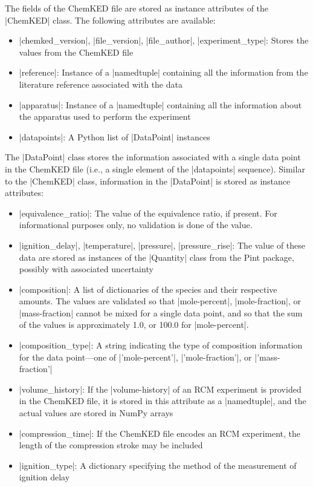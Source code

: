 \documentclass[12pt]{ijck}
\newcommand\ck{ChemKED}
\begin{document}
The fields of the \ck{} file are stored as instance attributes of the
\pybox|ChemKED| class. The following attributes are available:
%
\begin{itemize}
    \item \pybox|chemked_version|, \pybox|file_version|, \pybox|file_author|,
    \pybox|experiment_type|: Stores the values from the \ck{} file
    \item \pybox|reference|: Instance of a \pybox|namedtuple| containing all
    the information from the literature reference associated with the data
    \item \pybox|apparatus|: Instance of a \pybox|namedtuple| containing all
    the information about the apparatus used to perform the experiment
    \item \pybox|datapoints|: A Python list of \pybox|DataPoint| instances
\end{itemize}

The \pybox|DataPoint| class stores the information associated with a single data
point in the \ck{} file (i.e., a single element of the \yabox|datapoints|
sequence). Similar to the \pybox|ChemKED| class, information in the
\pybox|DataPoint| is stored as instance attributes:
%
\begin{itemize}
    \item \pybox|equivalence_ratio|: The value of the equivalence ratio, if
    present. For informational purposes only, no validation is done of the
    value.
    \item \pybox|ignition_delay|, \pybox|temperature|, \pybox|pressure|,
    \pybox|pressure_rise|: The value of these data are stored as instances of
    the \pybox|Quantity| class from the Pint \autocite{Grecco2016} package,
    possibly with associated uncertainty
    \item \pybox|composition|: A list of dictionaries of the species and their
    respective amounts. The values are validated so that \yabox|mole-percent|,
    \yabox|mole-fraction|, or \yabox|mass-fraction| cannot be mixed for a single
    data point, and so that the sum of the values is approximately 1.0, or
    100.0 for \yabox|mole-percent|.
    \item \pybox|composition_type|: A string indicating the type of composition
    information for the data point---one of \pybox|'mole-percent'|,
    \pybox|'mole-fraction'|, or \pybox|'mass-fraction'|
    \item \pybox|volume_history|: If the \yabox|volume-history| of an RCM
    experiment is provided in the \ck{} file, it is stored in this attribute as
    a \pybox|namedtuple|, and the actual values are stored in NumPy arrays
    \autocite{vanderWalt:2011np}
    \item \pybox|compression_time|: If the \ck{} file encodes an RCM experiment,
    the length of the compression stroke may be included
    \item \pybox|ignition_type|: A dictionary specifying the method of the
    measurement of ignition delay
\end{itemize}
\end{document}
